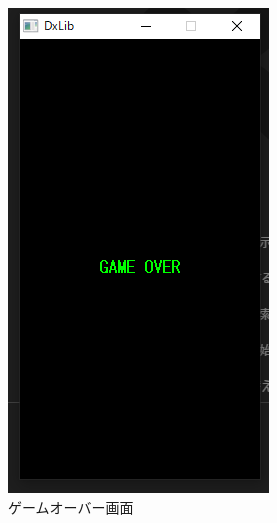 \begin{figure}[htb]
  \begin{center}
    \includegraphics[scale=0.5]{./soft_img/gameover.png}
    \caption{ゲームオーバー画面}
    \label{gameover}
  \end{center}
\end{figure}
